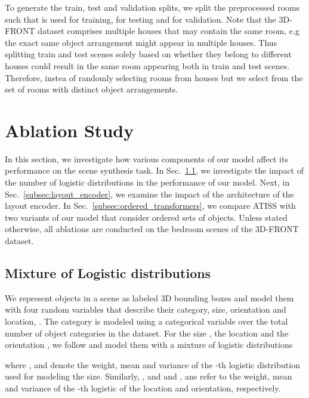 \documentclass{article}
\newcommand{\secref}[1]{Sec.~\ref{#1}}
\begin{document}
To generate the train, test and validation splits, we split the preprocessed
rooms such that  is used for training,  for testing and  for
validation. Note that the 3D-FRONT dataset comprises multiple houses that may
contain the same room, e.g the exact same object arrangement might appear in
multiple houses. Thus splitting train and test scenes solely based on whether
they belong to different houses could result in the same room appearing both in
train and test scenes. Therefore, instea of randomly selecting rooms from
houses but we select from the set of rooms with distinct object arrangements.

\section{Ablation Study}
\label{sec:ablations}

In this section, we investigate how various components of our model affect its
performance on the scene synthesis task. In
\secref{subsec:mixture_of_logistic_distributions}, we investigate the impact of
the number of logistic distributions in the performance of our model. 
Next, in
\secref{subsec:layout_encoder}, we examine the impact of the architecture of
the layout encoder. In \secref{subsec:ordered_transformers}, we compare
ATISS with two variants of our model that consider ordered sets of objects.
Unless stated otherwise, all ablations are conducted on the bedroom scenes of
the 3D-FRONT~\cite{Fu2020ARXIVa} dataset.

\subsection{Mixture of Logistic distributions}
\label{subsec:mixture_of_logistic_distributions}

We represent objects in a scene as labeled 3D bounding boxes and model them
with four random variables that describe their category, size, orientation and
location, . The category
 is modeled using a categorical variable over the total number of
object categories  in the dataset. For the size , the
location  and the orientation ,
we follow \cite{Salimans2017ICLR, Oord2016SSW} and model them with a mixture
of logistic distributions

where ,  and  denote the
weight, mean and variance of the -th logistic distribution used for
modeling the size. Similarly, ,  and  and
,  ans  refer to the weight, mean and variance of
the -th logistic of the location and orientation, respectively.
\end{document}
